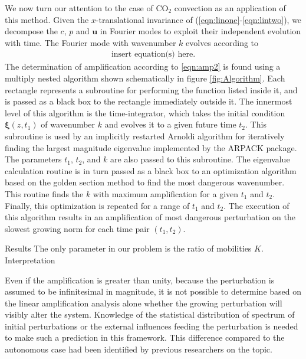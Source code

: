 \documentclass[letterpaper,10pt,prl,twocolumn,aps,reprint,superscriptaddress]{revtex4-1}
\newcommand{\cotwo}{CO$_2$ }
\newcommand{\bu}{\boldsymbol{u}}
\newcommand{\prt}{\boldsymbol{\xi}}
\begin{document}
We now turn our attention to the case of \cotwo convection as an application of this method. 
Given the $x$-translational invariance of (\ref{eqn:linone}-\ref{eqn:lintwo}), we decompose the $c$, $p$ and $\bu$ in Fourier modes to exploit their independent evolution with time. 
The Fourier mode with wavenumber $k$ evolves according to
\begin{align}
 \text{insert equation(s) here}.
\end{align}
The determination of amplification according to \eqref{eqn:amp2} is found using a multiply nested algorithm shown schematically in figure \ref{fig:Algorithm}. 
Each rectangle represents a subroutine for performing the function listed inside it, and is passed as a black box to the rectangle immediately outside it.
The innermost level of this algorithm is the time-integrator, which takes the initial condition $\prt(z, t_1)$ of wavenumber $k$ and evolves it to a given future time $t_2$. 
This subroutine is used by an implicitly restarted Arnoldi algorithm for iteratively finding the largest magnitude eigenvalue implemented by the ARPACK package\cite{lehoucq1998arpack}. 
The parameters $t_1$, $t_2$, and $k$ are also passed to this subroutine. 
The eigenvalue calculation routine is in turn passed as a black box to an optimization algorithm based on the golden section method to find the most dangerous wavenumber. 
This routine finds the $k$ with maximum amplification for a given $t_1$ and $t_2$. 
Finally, this optimization is repeated for a range of $t_1$ and $t_2$. 
The execution of this algorithm results in an amplification of most dangerous perturbation on the slowest growing norm for each time pair $(t_1, t_2)$. 

Results
The only parameter in our problem is the ratio of mobilities $K$. 
Interpretation

\vspace{1cm}

Even if the amplification is greater than unity, because the perturbation is assumed to be infinitesimal in magnitude, it is not possible to determine based on the linear amplification analysis alone whether the growing perturbation will visibly alter the system. 
Knowledge of the statistical distribution of spectrum of initial perturbations or the external influences feeding the perturbation is needed to make such a prediction in this framework. 
This difference compared to the autonomous case had been identified by previous researchers on the topic.
\end{document}
